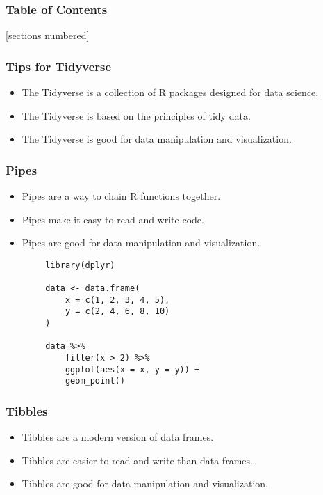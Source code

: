 \documentclass[serif, 9pt, aspectratio=32]{beamer}
\begin{document}
\begin{frame}
    \frametitle{Table of Contents}
    [sections numbered]
    \tableofcontents[currentsection]
\end{frame}

\begin{frame}
    \centering
    \frametitle{Tips for Tidyverse}
    \begin{itemize}
        \setlength{\itemsep}{2em}
        \item The Tidyverse is a collection of R packages designed for data science.
        \item The Tidyverse is based on the principles of tidy data.
        \item The Tidyverse is good for data manipulation and visualization.
    \end{itemize}
\end{frame}

\begin{frame}
    \centering
    \frametitle{Pipes}
    \begin{itemize}
        \setlength{\itemsep}{2em}
        \item Pipes are a way to chain R functions together.
        \item Pipes make it easy to read and write code.
        \item Pipes are good for data manipulation and visualization.
    \end{itemize}
\end{frame}

\begin{frame}[fragile]
    \begin{lstlisting}
        library(dplyr)

        data <- data.frame(
            x = c(1, 2, 3, 4, 5),
            y = c(2, 4, 6, 8, 10)
        )

        data %>%
            filter(x > 2) %>%
            ggplot(aes(x = x, y = y)) +
            geom_point()
    \end{lstlisting}
\end{frame}

\begin{frame}
    \centering
    \frametitle{Tibbles}
    \begin{itemize}
        \setlength{\itemsep}{2em}
        \item Tibbles are a modern version of data frames.
        \item Tibbles are easier to read and write than data frames.
        \item Tibbles are good for data manipulation and visualization.
    \end{itemize}
\end{frame}
\end{document}
